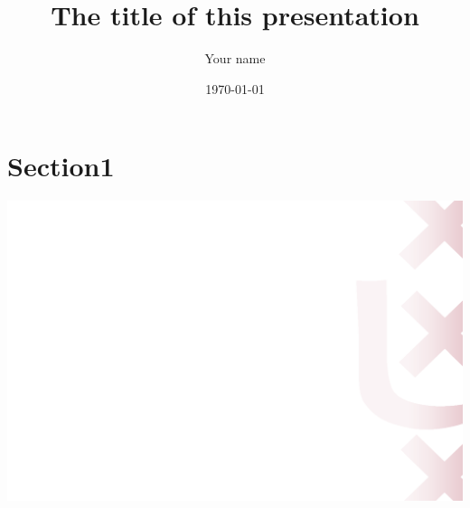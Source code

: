 \documentclass[compress]{beamer}
\title[Title shown in the bar]{The title of this presentation} %
\subtitle{} %
\author[Your email]{Your name}
\institute[Informatics Institute]{University of Amsterdam}
\date[\textcolor{white}{\today}]\today
\begin{document}

\frame[plain]{\titlepage} %


\section{Section1} %

{
    \includegraphics[width=\paperwidth,height=\paperheight]{UvA-bg.png}
}
\end{document}
